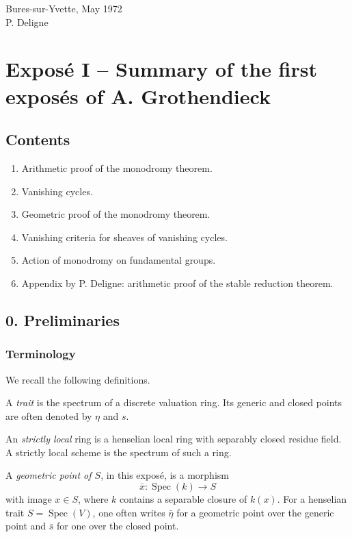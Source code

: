 \documentclass[11pt]{article}
\theoremstyle{plain}
\theoremstyle{definition}
\theoremstyle{remark}
\DeclareMathOperator{\Spec}{Spec}
\begin{document}
\begin{flushright}
Bures-sur-Yvette, May 1972\\
P. Deligne
\end{flushright}

\section*{Exposé I -- Summary of the first exposés of A. Grothendieck}

\subsection*{Contents}
\begin{enumerate}[label=\arabic*.]
\item Arithmetic proof of the monodromy theorem.
\item Vanishing cycles.
\item Geometric proof of the monodromy theorem.
\item Vanishing criteria for sheaves of vanishing cycles.
\item Action of monodromy on fundamental groups.
\item Appendix by P. Deligne: arithmetic proof of the stable reduction theorem.
\end{enumerate}

\subsection*{0. Preliminaries}

\subsubsection*{Terminology}

We recall the following definitions.

A \emph{trait} is the spectrum of a discrete valuation ring. Its generic and closed points are often denoted by $\eta$ and $s$.

An \emph{strictly local} ring is a henselian local ring with separably closed residue field. A strictly local scheme is the spectrum of such a ring.

A \emph{geometric point of $S$}, in this exposé, is a morphism
\[
\bar x:\Spec(k)\to S
\]
with image $x\in S$, where $k$ contains a separable closure of $k(x)$. For a henselian trait $S=\Spec(V)$, one often writes $\bar\eta$ for a geometric point over the generic point and $\bar s$ for one over the closed point.
\end{document}
